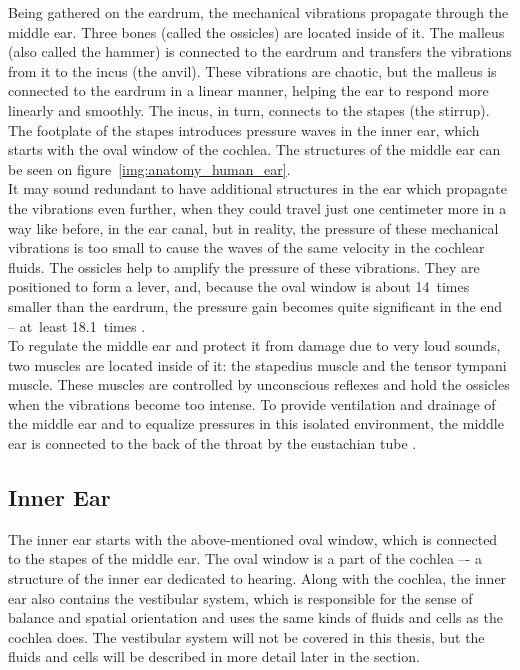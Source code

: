 Being gathered on the eardrum, the mechanical vibrations propagate through the middle ear. Three bones (called the ossicles) are located inside of it. The malleus (also called the hammer) is connected to the eardrum and transfers the vibrations from it to the incus (the anvil). These vibrations are chaotic, but the malleus is connected to the eardrum in a linear manner, helping the ear to respond more linearly and smoothly. The incus, in turn, connects to the stapes (the stirrup). The footplate of the stapes introduces pressure waves in the inner ear, which starts with the oval window of the cochlea. The structures of the middle ear can be seen on figure~\ref{img:anatomy_human_ear}.\\

It may sound redundant to have additional structures in the ear which propagate the vibrations even further, when they could travel just one centimeter more in a way like before, in the ear canal, but in reality, the pressure of these mechanical vibrations is too small to cause the waves of the same velocity in the cochlear fluids. The ossicles help to amplify the pressure of these vibrations. They are positioned to form a lever, and, because the oval window is about 14~times smaller than the eardrum, the pressure gain becomes quite significant in the end -- at~least 18.1~times \cite{Standring2008}.\\

To regulate the middle ear and protect it from damage due to very loud sounds, two muscles are located inside of it: the stapedius muscle and the tensor tympani muscle. These muscles are controlled by unconscious reflexes and hold the ossicles when the vibrations become too intense. To provide ventilation and drainage of the middle ear and to equalize pressures in this isolated environment, the middle ear is connected to the back of the throat by the eustachian tube \cite{Schnupp2011}.

\subsection{Inner Ear}

The inner ear starts with the above-mentioned oval window, which is connected to the stapes of the middle ear. The oval window is a part of the cochlea –- a structure of the inner ear dedicated to hearing. Along with the cochlea, the inner ear also contains the vestibular system, which is responsible for the sense of balance and spatial orientation and uses the same kinds of fluids and cells as the cochlea does. The vestibular system will not be covered in this thesis, but the fluids and cells will be described in more detail later in the section.\\

